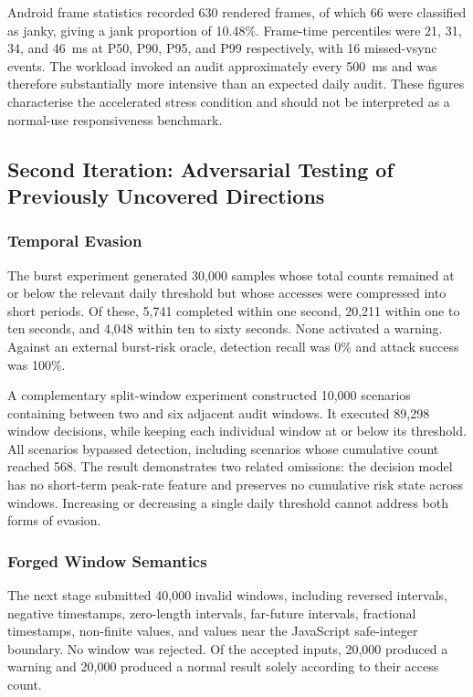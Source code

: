 Android frame statistics recorded 630 rendered frames, of which 66 were classified as janky, giving a jank proportion of 10.48\%. Frame-time percentiles were 21, 31, 34, and 46~ms at P50, P90, P95, and P99 respectively, with 16 missed-vsync events. The workload invoked an audit approximately every 500~ms and was therefore substantially more intensive than an expected daily audit. These figures characterise the accelerated stress condition and should not be interpreted as a normal-use responsiveness benchmark.

\subsection{Second Iteration: Adversarial Testing of Previously Uncovered Directions}

\subsubsection{Temporal Evasion}

The burst experiment generated 30,000 samples whose total counts remained at or below the relevant daily threshold but whose accesses were compressed into short periods. Of these, 5,741 completed within one second, 20,211 within one to ten seconds, and 4,048 within ten to sixty seconds. None activated a warning. Against an external burst-risk oracle, detection recall was 0\% and attack success was 100\%.

A complementary split-window experiment constructed 10,000 scenarios containing between two and six adjacent audit windows. It executed 89,298 window decisions, while keeping each individual window at or below its threshold. All scenarios bypassed detection, including scenarios whose cumulative count reached 568. The result demonstrates two related omissions: the decision model has no short-term peak-rate feature and preserves no cumulative risk state across windows. Increasing or decreasing a single daily threshold cannot address both forms of evasion.

\subsubsection{Forged Window Semantics}

The next stage submitted 40,000 invalid windows, including reversed intervals, negative timestamps, zero-length intervals, far-future intervals, fractional timestamps, non-finite values, and values near the JavaScript safe-integer boundary. No window was rejected. Of the accepted inputs, 20,000 produced a warning and 20,000 produced a normal result solely according to their access count.

